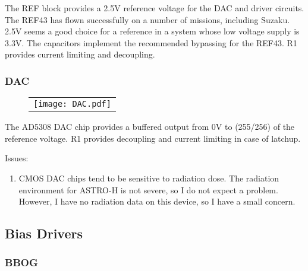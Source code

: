 \documentclass[a4paper,12pt]{article}
\begin{document}
The REF block provides a 2.5V reference voltage for the DAC and driver circuits. The REF43 has flown successfully on a number of missions, including Suzaku. 2.5V seems a good choice for a reference in a system whose low voltage supply is 3.3V. The capacitors implement the recommended bypassing for the REF43.
R1 provides current limiting and decoupling.


\subsubsection{DAC}
   \begin{figure}
   \begin{center}
   \begin{tabular}{c}
   \texttt{[image: DAC.pdf]}
   \end{tabular}
   \end{center}
   \end{figure}
The AD5308 DAC chip provides a buffered output from 0V to (255/256) of the reference voltage. R1 provides decoupling and current limiting in case of latchup.

Issues:
\begin{enumerate}
\item
CMOS DAC chips tend to be sensitive to radiation dose. The radiation environment for ASTRO-H is not severe, so I do not expect a problem. However, I have no radiation data on this device, so I have a small concern.
\end{enumerate}

\subsection{Bias Drivers}
\subsubsection{BBOG}
\end{document}
